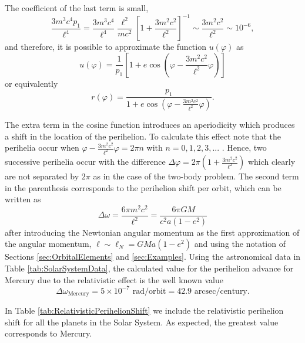 The coefficient of the last term is small,
\begin{equation}
\frac{3m^3 c^4 p_1}{\ell^4} =\frac{3m^3 c^4 }{\ell^4} \frac{\ell^2}{mc^2}  \left[ 1 + \frac{3m^2 c^2}{\ell^2}  \right]^{-1} \sim \frac{3m^2 c^2}{\ell^2} \sim 10^{-6},
\end{equation}
and therefore, it is possible to approximate the function $u(\varphi)$ as
\begin{equation}
u(\varphi) = \frac{1}{ p_1  } \left[ 1+ e \cos \left( \varphi - \frac{3m^2 c^2}{\ell^2}  \varphi \right) \right]
\end{equation}
or equivalently
\begin{equation}
r(\varphi) =\frac{p_1  } { 1+ e \cos \left( \varphi - \frac{3m^2 c^2}{\ell^2}  \varphi \right) }.
\end{equation}

The extra term in the cosine function introduces an aperiodicity which produces a shift in the location of the perihelion. To calculate this effect note that the perihelia occur when $\varphi - \frac{3m^2 c^2}{\ell^2}  \varphi  = 2\pi n$ with $n=0,1,2,3,...$ . Hence, two successive perihelia occur with the difference $\Delta \varphi = 2\pi \left( 1 + \frac{3m^2 c^2}{\ell^2} \right)$ which clearly are not separated by $2\pi$ as in the case of the two-body problem. The second term in the parenthesis corresponds to the perihelion shift per orbit, which can be written as
\begin{equation}
\Delta \omega = \frac{6\pi m^2 c^2}{\ell^2} = \frac{6 \pi GM}{c^2 a (1-e^2)} \label{eq:SchwarzschildPerihelionAdvance}
\end{equation}
after introducing the Newtonian angular momentum as the first approximation of the angular momentum, $\ell \sim \ell _N = GM a (1-e^2)$ and using the notation of Sections \ref{sec:OrbitalElements} and \ref{sec:Examples}. Using the astronomical data in Table \ref{tab:SolarSystemData}, the calculated value for the perihelion advance for Mercury due to the relativistic effect is the well known value
\begin{equation}
\Delta \omega_{\textrm{Mercury}} = 5\times 10^{-7} \textrm{ rad/orbit} =  42.9 \textrm{ arcsec/century} .
\end{equation}

In Table \ref{tab:RelativisticPerihelionShift} we include the relativistic perihelion shift for all the planets in the Solar System. As expected, the greatest value corresponds to Mercury. 

